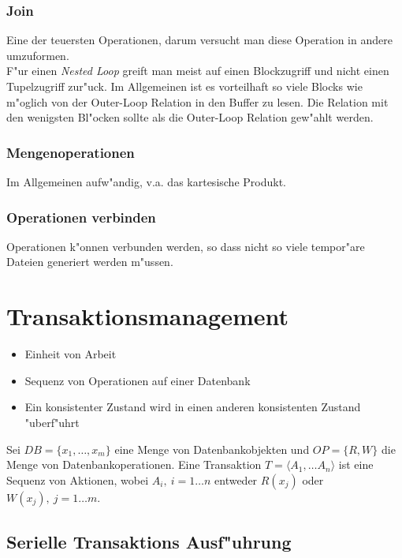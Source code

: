 \documentclass[german, 10pt, a4paper, twocolumn]{scrartcl}
\theoremstyle{definition}
\theoremstyle{remark}
\theoremstyle{example}
\begin{document}
\subsubsection{Join}

Eine der teuersten Operationen, darum versucht man diese Operation in andere umzuformen.\\

F"ur einen \textit{Nested Loop} greift man meist auf einen Blockzugriff und nicht einen Tupelzugriff zur"uck. Im Allgemeinen ist es vorteilhaft so viele Blocks wie m"oglich von der Outer-Loop Relation in den Buffer zu lesen. Die Relation mit den wenigsten Bl"ocken sollte als die Outer-Loop Relation gew"ahlt werden.

\subsubsection{Mengenoperationen}

Im Allgemeinen aufw"andig, v.a. das kartesische Produkt.

\subsubsection{Operationen verbinden}

Operationen k"onnen verbunden werden, so dass nicht so viele tempor"are Dateien generiert werden m"ussen.

\section{Transaktionsmanagement}

\begin{itemize}
	\item Einheit von Arbeit
	\item Sequenz von Operationen auf einer Datenbank
	\item Ein konsistenter Zustand wird in einen anderen konsistenten Zustand "uberf"uhrt
\end{itemize}

Sei $DB = \{ x_1, \ldots, x_m \}$ eine Menge von Datenbankobjekten und $OP=\{R, W\}$ die Menge von Datenbankoperationen. Eine Transaktion $T= \langle A_1, \ldots A_n \rangle$ ist eine Sequenz von Aktionen, wobei $A_i, \ i=1\ldots n$  entweder $R(x_j)$ oder $W(x_j), \ j=1\ldots m$.

\subsection{Serielle Transaktions Ausf"uhrung}
\end{document}
